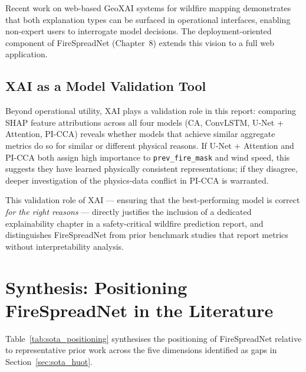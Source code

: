 Recent work on web-based GeoXAI systems for wildfire mapping \citep{geoxai2025} demonstrates that both explanation types can be surfaced in operational interfaces, enabling non-expert users to interrogate model decisions.
The deployment-oriented component of FireSpreadNet (Chapter~8) extends this vision to a full web application.

\subsection{XAI as a Model Validation Tool}

Beyond operational utility, XAI plays a validation role in this report: comparing SHAP feature attributions across all four models (CA, ConvLSTM, U-Net + Attention, PI-CCA) reveals whether models that achieve similar aggregate metrics do so for similar or different physical reasons.
If U-Net + Attention and PI-CCA both assign high importance to \texttt{prev\_fire\_mask} and wind speed, this suggests they have learned physically consistent representations; if they disagree, deeper investigation of the physics-data conflict in PI-CCA is warranted.

This validation role of XAI — ensuring that the best-performing model is correct \emph{for the right reasons} — directly justifies the inclusion of a dedicated explainability chapter in a safety-critical wildfire prediction report, and distinguishes FireSpreadNet from prior benchmark studies that report metrics without interpretability analysis.

\section{Synthesis: Positioning FireSpreadNet in the Literature}
\label{sec:sota_synthesis}

Table~\ref{tab:sota_positioning} synthesises the positioning of FireSpreadNet relative to representative prior work across the five dimensions identified as gaps in Section~\ref{sec:sota_huot}.

